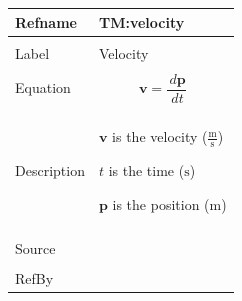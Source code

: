 \documentclass[12pt]{article}
\begin{document}
\begin{minipage}{\textwidth}
\begin{tabular}{>{\raggedright}p{}>{\raggedright\arraybackslash}p{}}
\toprule \textbf{Refname} & \textbf{TM:velocity}
\label{TM:velocity}
\\ \midrule \\
Label & Velocity
        
\\ \midrule \\
Equation & \begin{displaymath}
           \symbf{v}=\frac{\,d\symbf{p}}{\,dt}
           \end{displaymath}
\\ \midrule \\
Description & \begin{symbDescription}
              \item{$\symbf{v}$ is the velocity ($\frac{\text{m}}{\text{s}}$)}
              \item{$t$ is the time (${\text{s}}$)}
              \item{$\symbf{p}$ is the position (${\text{m}}$)}
              \end{symbDescription}
\\ \midrule \\
Source & \cite{velocityWiki}
         
\\ \midrule \\
RefBy & 
\\ \bottomrule
\end{tabular}
\end{minipage}
\vspace{\baselineskip}
\noindent
\end{document}
